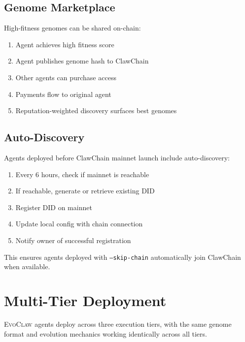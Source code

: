 \documentclass{article}
\newcommand{\evoclaw}{\textsc{EvoClaw}}
\begin{document}
\subsection{Genome Marketplace}

High-fitness genomes can be shared on-chain:

\begin{enumerate}[leftmargin=*]
    \item Agent achieves high fitness score
    \item Agent publishes genome hash to ClawChain
    \item Other agents can purchase access
    \item Payments flow to original agent
    \item Reputation-weighted discovery surfaces best genomes
\end{enumerate}

\subsection{Auto-Discovery}

Agents deployed before ClawChain mainnet launch include auto-discovery:

\begin{enumerate}[leftmargin=*]
    \item Every 6 hours, check if mainnet is reachable
    \item If reachable, generate or retrieve existing DID
    \item Register DID on mainnet
    \item Update local config with chain connection
    \item Notify owner of successful registration
\end{enumerate}

This ensures agents deployed with \texttt{--skip-chain} automatically join ClawChain when available.



\section{Multi-Tier Deployment}
\label{sec:deployment}

\evoclaw{} agents deploy across three execution tiers, with the same genome format and evolution mechanics working identically across all tiers.
\end{document}
